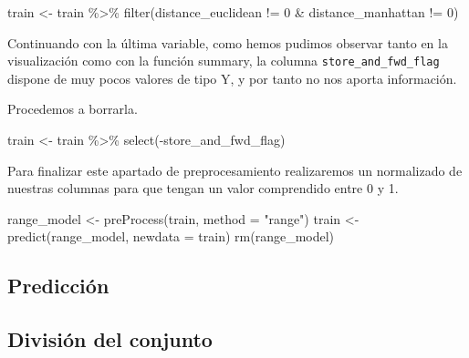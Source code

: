 \documentclass[
]{article}
\newenvironment{Shaded}{\begin{snugshade}}{\end{snugshade}}
\newcommand{\AttributeTok}[1]{\textcolor[rgb]{0.77,0.63,0.00}{#1}}
\newcommand{\DecValTok}[1]{\textcolor[rgb]{0.00,0.00,0.81}{#1}}
\newcommand{\FunctionTok}[1]{\textcolor[rgb]{0.00,0.00,0.00}{#1}}
\newcommand{\NormalTok}[1]{#1}
\newcommand{\OtherTok}[1]{\textcolor[rgb]{0.56,0.35,0.01}{#1}}
\newcommand{\SpecialCharTok}[1]{\textcolor[rgb]{0.00,0.00,0.00}{#1}}
\newcommand{\StringTok}[1]{\textcolor[rgb]{0.31,0.60,0.02}{#1}}
\begin{document}
\begin{Shaded}
\begin{Highlighting}[]
\NormalTok{train }\OtherTok{\textless{}{-}}\NormalTok{ train }\SpecialCharTok{\%\textgreater{}\%} \FunctionTok{filter}\NormalTok{(distance\_euclidean }\SpecialCharTok{!=} \DecValTok{0} \SpecialCharTok{\&}\NormalTok{ distance\_manhattan }\SpecialCharTok{!=} \DecValTok{0}\NormalTok{)}
\end{Highlighting}
\end{Shaded}

Continuando con la última variable, como hemos pudimos observar tanto en
la visualización como con la función summary, la columna
\texttt{store\_and\_fwd\_flag} dispone de muy pocos valores de tipo Y, y
por tanto no nos aporta información.

Procedemos a borrarla.

\begin{Shaded}
\begin{Highlighting}[]
\NormalTok{train }\OtherTok{\textless{}{-}}\NormalTok{ train }\SpecialCharTok{\%\textgreater{}\%} \FunctionTok{select}\NormalTok{(}\SpecialCharTok{{-}}\NormalTok{store\_and\_fwd\_flag)}
\end{Highlighting}
\end{Shaded}

Para finalizar este apartado de preprocesamiento realizaremos un
normalizado de nuestras columnas para que tengan un valor comprendido
entre 0 y 1.

\begin{Shaded}
\begin{Highlighting}[]
\NormalTok{range\_model }\OtherTok{\textless{}{-}} \FunctionTok{preProcess}\NormalTok{(train, }\AttributeTok{method =} \StringTok{"range"}\NormalTok{)}
\NormalTok{train }\OtherTok{\textless{}{-}} \FunctionTok{predict}\NormalTok{(range\_model, }\AttributeTok{newdata =}\NormalTok{ train)}
\FunctionTok{rm}\NormalTok{(range\_model)}
\end{Highlighting}
\end{Shaded}

\hypertarget{predicciuxf3n}{%
\subsection{Predicción}\label{predicciuxf3n}}

\hypertarget{divisiuxf3n-del-conjunto}{%
\subsection{División del conjunto}\label{divisiuxf3n-del-conjunto}}
\end{document}
